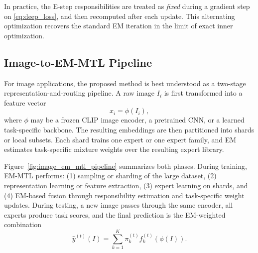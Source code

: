 \documentclass[preprint,12pt]{elsarticle}
\begin{document}
	In practice, the E-step responsibilities are treated as \emph{fixed}
	during a gradient step on \eqref{eq:deep_loss}, and then recomputed
	after each update. This alternating optimization recovers the standard
	EM iteration in the limit of exact inner optimization.

	\subsection{Image-to-EM-MTL Pipeline}

	For image applications, the proposed method is best understood as a
	two-stage representation-and-routing pipeline. A raw image $I_i$ is
	first transformed into a feature vector
	\begin{equation}
		x_i = \phi(I_i),
		\label{eq:image_encoder}
	\end{equation}
	where $\phi$ may be a frozen CLIP image encoder, a pretrained CNN, or a
	learned task-specific backbone. The resulting embeddings are then
	partitioned into shards or local subsets. Each shard trains one expert
	or one expert family, and EM estimates task-specific mixture weights
	over the resulting expert library.

	Figure~\ref{fig:image_em_mtl_pipeline} summarizes both phases. During
	training, EM-MTL performs: (1) sampling or sharding of the large dataset,
	(2) representation learning or feature extraction, (3) expert learning
	on shards, and (4) EM-based fusion through responsibility estimation and
	task-specific weight updates. During testing, a new image passes through
	the same encoder, all experts produce task scores, and the final
	prediction is the EM-weighted combination
	\begin{equation}
		\hat{y}^{(t)}(I)
		=
		\sum_{k=1}^K \pi_k^{(t)}
		f_k^{(t)}\!\left(\phi(I)\right).
		\label{eq:image_prediction}
	\end{equation}
\end{document}
